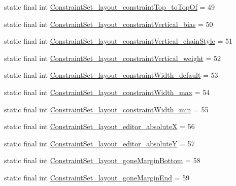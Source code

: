 \begin{DoxyCompactItemize}
\item 
static final int \mbox{\hyperlink{classandroid_1_1support_1_1constraint_1_1R_1_1styleable_a43c4a550f6e4869061fe1a1de4fd15fb}{Constraint\+Set\+\_\+layout\+\_\+constraint\+Top\+\_\+to\+Top\+Of}} = 49
\item 
static final int \mbox{\hyperlink{classandroid_1_1support_1_1constraint_1_1R_1_1styleable_a2b3b6f5605f91bc6ae18804805d8a443}{Constraint\+Set\+\_\+layout\+\_\+constraint\+Vertical\+\_\+bias}} = 50
\item 
static final int \mbox{\hyperlink{classandroid_1_1support_1_1constraint_1_1R_1_1styleable_a53efdba2b381d54d98240ef4c76c2ef4}{Constraint\+Set\+\_\+layout\+\_\+constraint\+Vertical\+\_\+chain\+Style}} = 51
\item 
static final int \mbox{\hyperlink{classandroid_1_1support_1_1constraint_1_1R_1_1styleable_a8ef0b9dd7e8ebb03f8a891985766f70d}{Constraint\+Set\+\_\+layout\+\_\+constraint\+Vertical\+\_\+weight}} = 52
\item 
static final int \mbox{\hyperlink{classandroid_1_1support_1_1constraint_1_1R_1_1styleable_a9d0bfb012bf348905558f072fd1a0dae}{Constraint\+Set\+\_\+layout\+\_\+constraint\+Width\+\_\+default}} = 53
\item 
static final int \mbox{\hyperlink{classandroid_1_1support_1_1constraint_1_1R_1_1styleable_ac2a03f82c58a968cc73c7c335bb879fb}{Constraint\+Set\+\_\+layout\+\_\+constraint\+Width\+\_\+max}} = 54
\item 
static final int \mbox{\hyperlink{classandroid_1_1support_1_1constraint_1_1R_1_1styleable_af15994ec10223ae13d190636a17ca11d}{Constraint\+Set\+\_\+layout\+\_\+constraint\+Width\+\_\+min}} = 55
\item 
static final int \mbox{\hyperlink{classandroid_1_1support_1_1constraint_1_1R_1_1styleable_a74eece3f74f9b7e9e0649dcee1979a53}{Constraint\+Set\+\_\+layout\+\_\+editor\+\_\+absoluteX}} = 56
\item 
static final int \mbox{\hyperlink{classandroid_1_1support_1_1constraint_1_1R_1_1styleable_a532538838976eae8a9e64f433260c409}{Constraint\+Set\+\_\+layout\+\_\+editor\+\_\+absoluteY}} = 57
\item 
static final int \mbox{\hyperlink{classandroid_1_1support_1_1constraint_1_1R_1_1styleable_a753460c26fea8c22a136b940ddcdb73f}{Constraint\+Set\+\_\+layout\+\_\+gone\+Margin\+Bottom}} = 58
\item 
static final int \mbox{\hyperlink{classandroid_1_1support_1_1constraint_1_1R_1_1styleable_a7081428f7c0e16e4db274a90994c7954}{Constraint\+Set\+\_\+layout\+\_\+gone\+Margin\+End}} = 59

\end{DoxyCompactItemize}
